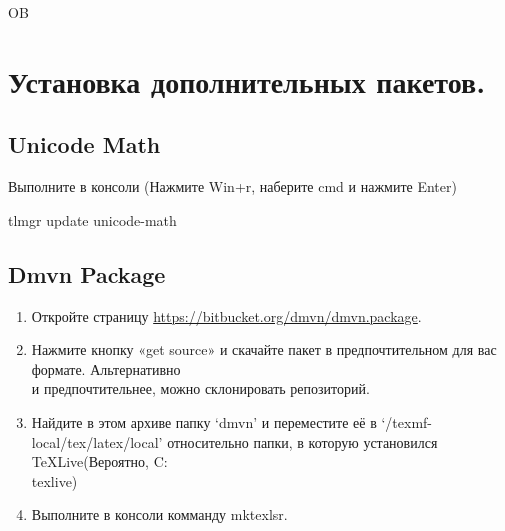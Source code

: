 OB\section{Установка дополнительных пакетов.}

\subsection{Unicode Math}
Выполните в консоли (Нажмите Win+r, наберите {\ttfamily cmd} и нажмите {\ttfamily Enter})\par
{\ttfamily tlmgr update unicode-math}

\subsection{Dmvn Package}
\begin{enumerate}
  \item Откройте страницу \url{https://bitbucket.org/dmvn/dmvn.package}.
  \item Нажмите кнопку «get source» и скачайте пакет в предпочтительном для вас формате. Альтернативно \\
    и предпочтительнее, можно склонировать репозиторий. 
  \item Найдите в этом архиве папку `{\ttfamily dmvn}'  и переместите её в `{\ttfamily /texmf-local/tex/latex/local}' относительно папки, в которую установился
  TeXLive(Вероятно, {\ttfamily C:\\texlive}) 
  \item Выполните в консоли комманду {\ttfamily mktexlsr}.
\end{enumerate}

